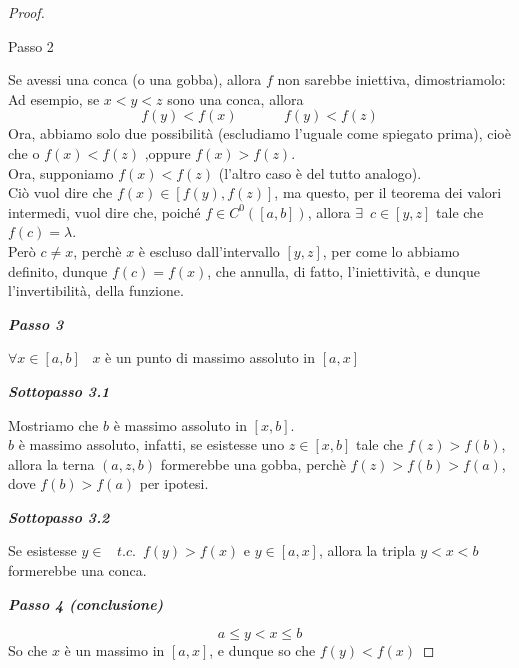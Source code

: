 \documentclass{article}
\theoremstyle{definition}
\begin{document}
\begin{proof}
\begin{center}
    Passo 2
\end{center}
Se avessi una conca (o una gobba), allora $f$ non sarebbe iniettiva, dimostriamolo:
\\
Ad esempio, se $x<y<z$ sono una conca, allora
\begin{equation}
    f(y)<f(x) \,\,\,\,\,\,\,\,\,\,\,\,\,\,\,\,\,\,\,\,f(y)<f(z)
\end{equation}
Ora, abbiamo solo due possibilità (escludiamo l'uguale come spiegato prima), cioè che o $f(x)<f(z)$ ,oppure $f(x)>f(z)$.
\\
Ora, supponiamo $f(x)<f(z)$ (l'altro caso è del tutto analogo).
\\
Ciò vuol dire che $f(x) \in [f(y),f(z)]$, ma questo, per il teorema dei valori intermedi, vuol dire che, poiché $f \in C^0([a,b])$, allora $\exists \,\,\, c \in [y,z]$ tale che $f(c)=\lambda$.
\\
Però $c \neq x$, perchè $x$ è escluso dall'intervallo $[y,z]$, per come lo abbiamo definito, dunque $f(c)=f(x)$, che annulla, di fatto, l'iniettività, e dunque l'invertibilità, della funzione.
\\
\begin{center}
    \textbf{\textit{Passo 3}}
\end{center}
$\forall x \in [a,b] \,\,\,$ $x$ è un punto di massimo assoluto in $[a,x]$
\begin{center}
    \textbf{\textit{Sottopasso 3.1}}
\end{center}
Mostriamo che $b$ è massimo assoluto in $[x,b]$.
\\
$b$ è massimo assoluto, infatti, se esistesse uno $z \in [x,b]$ tale che $f(z)>f(b)$, allora la terna $(a,z,b)$ formerebbe una gobba, perchè $f(z)>f(b)>f(a)$, dove $f(b)>f(a)$ per ipotesi.
\begin{center}
    \textbf{\textit{Sottopasso 3.2}}
\end{center}

Se esistesse $ y \in \,\,\,\,\, t.c. \,\,\, f(y) > f(x)$ e $y \in [a,x]$, allora la tripla $y<x<b$ formerebbe una conca.
\begin{center}
    \textbf{\textit{Passo 4 (conclusione)}}
\end{center}
\begin{equation}
    a \leqslant y <x\leqslant b
\end{equation}
So che $x$ è un massimo in $[a,x]$, e dunque so che $f(y)<f(x)$
\end{proof}
\end{document}
